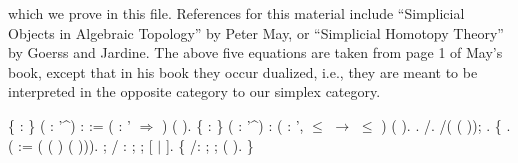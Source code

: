 \documentclass[12pt]{report}
\begin{document}
 which we prove in this file. References for this material include ``Simplicial Objects in Algebraic Topology'' by Peter May, or ``Simplicial Homotopy Theory'' by Goerss and Jardine. The above five equations are taken from page 1 of May's book, except that in his book they occur dualized, i.e., they are meant to be interpreted in the opposite category to our simplex category. 
\begin{coqdoccode}
\coqdocemptyline
\coqdocemptyline
\coqdocnoindent
{}  \{  : \} ( : '\^{}) :  :=\coqdoceol
\coqdocindent{1.00em}
 (   : ' \ensuremath{\Rightarrow}   ) ( ).\coqdoceol
\coqdocemptyline
\coqdocnoindent
{}  \{  : \} ( : '\^{})\coqdoceol
\coqdocindent{1.00em}
:  (\coqdockw{\ensuremath{\forall}}   : ',  \ensuremath{\le}  \ensuremath{\rightarrow}   \ensuremath{\le}  ) ( ).\coqdoceol
\coqdocnoindent
{}.\coqdoceol
\coqdocindent{1.00em}
 /.\coqdoceol
\coqdocindent{1.00em}
/( ( \coqdocvar{\_} \coqdocvar{\_} \coqdocvar{\_} \coqdocvar{\_}));  .\coqdoceol
\coqdocindent{1.00em}
\{    .\coqdoceol
\coqdocindent{2.00em}
 ( := (   ( ) ( ))).\coqdoceol
\coqdocindent{2.00em}
    ; / : ;  ;\coqdoceol
\coqdocindent{3.00em}
   [ \ensuremath{|} ].\coqdoceol
\coqdocindent{2.00em}
\{ \coqdoceol
\coqdocindent{3.00em}
\coqdoceol
\coqdocindent{3.00em}
/: ;  ;   ( ). \}\coqdoceol

\end{coqdoccode}
\end{document}
